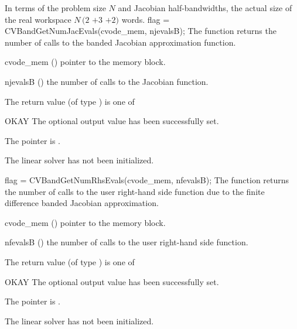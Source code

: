 {
  In terms of the problem size $N$ and Jacobian half-bandwidths, 
  the actual size of the real workspace
  $N\,(2$ $+ 3$  $+ 2)$  words.
}
{
  flag = CVBandGetNumJacEvals(cvode\_mem, njevalsB);
}
{
  The function  returns the
  number of calls to the banded Jacobian approximation function.
}
{
  \begin{args}
  \item[cvode\_mem] ()
    pointer to the {\cvode} memory block.
  \item[njevalsB] ()
    the number of calls to the Jacobian function.
  \end{args}
}
{
  The return value  (of type ) is one of
  \begin{args}
  \item[OKAY] 
    The optional output value has been successfully set.
  \item[\Id{LIN\_NO\_MEM}]
    The  pointer is .
  \item[\Id{LIN\_NO\_LMEM}]
    The {\cvband} linear solver has not been initialized.
  \end{args}
}
{}
{
  flag = CVBandGetNumRhsEvals(cvode\_mem, nfevalsB);
}
{
  The function  returns the
  number of calls to the user right-hand side function due to the 
  finite difference banded Jacobian approximation.
}
{
  \begin{args}
  \item[cvode\_mem] ()
    pointer to the {\cvode} memory block.
  \item[nfevalsB] ()
    the number of calls to the user right-hand side function.
  \end{args}
}
{
  The return value  (of type ) is one of
  \begin{args}
  \item[OKAY] 
    The optional output value has been successfully set.
  \item[\Id{LIN\_NO\_MEM}]
    The  pointer is .
  \item[\Id{LIN\_NO\_LMEM}]
    The {\cvband} linear solver has not been initialized.
  \end{args}
}
